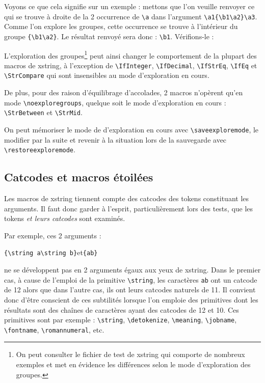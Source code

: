\documentclass[a4paper,10pt,french]{article}
\newcommand\Xstring{\textsf{xstring}\xspace}
\newcommand\verbinline{\lstinline[basicstyle=\normalsize\ttfamily]}
\begin{document}
Voyons ce que cela signifie sur un exemple : mettons que l'on veuille renvoyer ce qui se trouve à droite de la 2\ieme{} occurrence de \verb|\a| dans l'argument \verb|\a1{\b1\a2}\a3|. Comme l'on explore les groupes, cette occurrence se trouve à l'intérieur du groupe \verb|{\b1\a2}|. Le résultat renvoyé sera donc : \verb|\b1|. Vérifions-le :



L'exploration des groupes\footnote{On peut consulter le fichier de test de \Xstring qui comporte de nombreux exemples et met en évidence les différences selon le mode d'exploration des groupes.} peut ainsi changer le comportement de la plupart des macros de \Xstring, à l'exception de \verbinline|\IfInteger|, \verbinline|\IfDecimal|, \verbinline|\IfStrEq|, \verbinline|\IfEq| et \verbinline|\StrCompare| qui sont insensibles au mode d'exploration en cours.

De plus, pour des raison d'équilibrage d'accolades, 2 macros n'opèrent qu'en mode \verbinline|\noexploregroups|, quelque soit le mode d'exploration en cours : \verbinline|\StrBetween| et \verbinline|\StrMid|.\medskip

On peut mémoriser le mode de d'exploration en cours avec \verbinline|\saveexploremode|, le modifier par la suite et revenir à la situation lors de la sauvegarde avec \verbinline|\restoreexploremode|.

\subsection{Catcodes et macros étoilées}
\label{macrosetoilees}
Les macros de \Xstring tiennent compte des catcodes des tokens constituant les arguments. Il faut donc garder à l'esprit, particulièrement lors des tests, que les tokens \emph{et leurs catcodes} sont examinés.\medskip

Par exemple, ces 2 arguments :\par\nobreak\smallskip
\hfil\verb|{\string a\string b}|\qquad et\qquad\verb|{ab}|\hfil{}\par\smallskip
ne se développent pas en 2 arguments égaux aux yeux de \Xstring. Dans le premier cas, à cause de l'emploi de la primitive \verb|\string|, les caractères \og\verb|ab|\fg{} ont un catcode de 12 alors que dans l'autre cas, ils ont leurs catcodes naturels de 11. Il convient donc d'être conscient de ces subtilités lorsque l'on emploie des primitives dont les résultats sont des chaînes de caractères ayant des catcodes de 12 et 10. Ces primitives sont par exemple : \verb|\string|, \verb|\detokenize|, \verb|\meaning|, \verb|\jobname|, \verb|\fontname|, \verb|\romannumeral|, etc.\medskip
\end{document}
